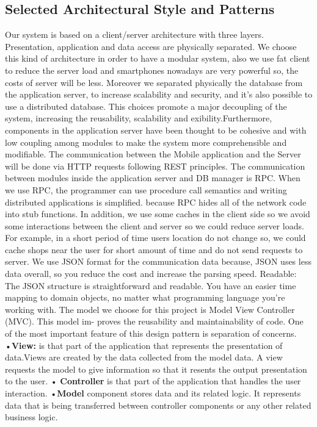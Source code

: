 \subsection{Selected Architectural Style and Patterns}
Our system is based on a client/server architecture with three layers. Presentation, application and data access are physically separated. We choose this kind of architecture in order to have a modular system, also we use fat client to reduce the server load and smartphones nowadays are very powerful so, the costs of server will be less. Moreover we separated physically the database from the application server, to increase scalability and security, and it's also possible to use a distributed database. This choices promote a major decoupling of the system, increasing the reusability, scalability and  exibility.Furthermore, components in the application server have been thought to be cohesive and with low coupling among modules to make the system more comprehensible and modifiable.
The communication between the Mobile application and the Server will be done via
HTTP requests following REST principles. The communication between modules inside the application server and DB manager is RPC. When we use RPC, the programmer can use procedure call semantics and writing distributed applications is simplified.
because RPC hides all of the network code into stub functions.
\newline
In addition, we use some caches in the client side so we avoid some interactions between the client and server so we could reduce server loads. For example, in a short period of time users location do not change so, we could cache shops near the user for short amount of time and do not send requests to server.
We use JSON format for the communication data because, JSON uses less data overall,
so you reduce the cost and increase the parsing speed. Readable: The JSON structure
is straightforward and readable. You have an easier time mapping to domain objects,
no matter what programming language you're working with.
The model we choose for this project is Model View Controller (MVC). This model im-
proves the reusability and maintainability of code. One of the most important feature
of this design pattern is separation of concerns.\newline\newline
•\textbf{View:}  is that part of the application that represents the presentation of data.Views are created by the data collected from the model data. A view requests the model to give information so that it resents the output presentation to the user.\newline\newline
• \textbf{Controller} is that part of the application that handles the user interaction.\newline\newline
•\textbf{Model}  component stores data and its related logic. It represents data that is being transferred between controller components or any other related business logic.\newline\newline
